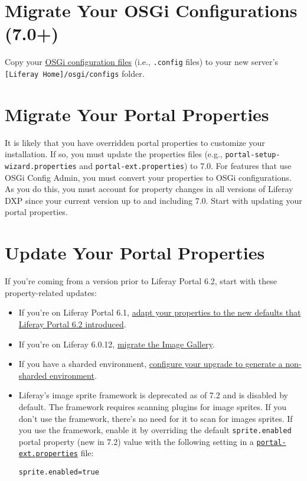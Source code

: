 \section{Migrate Your OSGi Configurations
(7.0+)}\label{migrate-your-osgi-configurations-7.0}

Copy your
\href{/docs/7-2/user/-/knowledge_base/u/understanding-system-configuration-files}{OSGi
configuration files} (i.e., \texttt{.config} files) to your new server's
\texttt{{[}Liferay\ Home{]}/osgi/configs} folder.

\section{Migrate Your Portal
Properties}\label{migrate-your-portal-properties}

It is likely that you have overridden portal properties to customize
your installation. If so, you must update the properties files (e.g.,
\texttt{portal-setup-wizard.properties} and
\texttt{portal-ext.properties}) to 7.0. For features that use OSGi
Config Admin, you must convert your properties to OSGi configurations.
As you do this, you must account for property changes in all versions of
Liferay DXP since your current version up to and including 7.0. Start
with updating your portal properties.

\section{Update Your Portal
Properties}\label{update-your-portal-properties}

If you're coming from a version prior to Liferay Portal 6.2, start with
these property-related updates:

\begin{itemize}
\item
  If you're on Liferay Portal 6.1,
  \href{/docs/6-2/deploy/-/knowledge_base/d/upgrading-liferay\#review-the-liferay-6}{adapt
  your properties to the new defaults that Liferay Portal 6.2
  introduced}.
\item
  If you're on Liferay 6.0.12,
  \href{/docs/6-2/deploy/-/knowledge_base/d/upgrading-liferay\#migrate-your-image-gallery-images}{migrate
  the Image Gallery}.
\item
  If you have a sharded environment,
  \href{/docs/7-2/deploy/-/knowledge_base/d/upgrading-a-sharded-environment}{configure
  your upgrade to generate a non-sharded environment}.
\item
  Liferay's image sprite framework is deprecated as of 7.2 and is
  disabled by default. The framework requires scanning plugins for image
  sprites. If you don't use the framework, there's no need for it to
  scan for images sprites. If you use the framework, enable it by
  overriding the default \texttt{sprite.enabled} portal property (new in
  7.2) value with the following setting in a
  \href{/docs/7-2/deploy/-/knowledge_base/d/portal-properties}{\texttt{portal-ext.properties}}
  file:

\begin{verbatim}
sprite.enabled=true
\end{verbatim}
\end{itemize}

